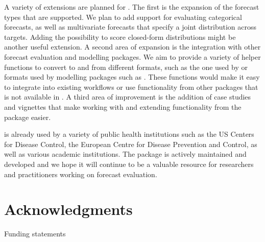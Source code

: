 \documentclass[
]{jss}
\begin{document}
A variety of extensions are planned for . The first is
the expansion of the forecast types that are supported. We plan to add
support for evaluating categorical forecasts, as well as multivariate
forecasts that specify a joint distribution across targets. Adding the
possibility to score closed-form distributions might be another useful
extension. A second area of expansion is the integration with other
forecast evaluation and modelling packages. We aim to provide a variety
of helper functions to convert to and from different formats, such as
the one used by  or formats used by modelling packages
such as . These functions would make it easy to integrate
 into existing workflows or use functionality from
other packages that is not available in . A third area
of improvement is the addition of case studies and vignettes that make
working with and extending functionality from the package easier.

 is already used by a variety of public health
institutions such as the US Centers for Disease Control, the European
Centre for Disease Prevention and Control, as well as various academic
institutions. The package is actively maintained and developed and we
hope it will continue to be a valuable resource for researchers and
practitioners working on forecast evaluation.

\section{Acknowledgments}\label{acknowledgments}

Funding statements
\end{document}

